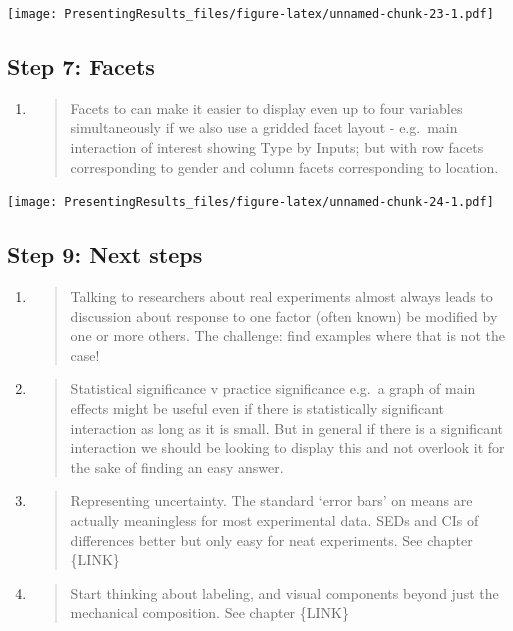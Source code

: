 \documentclass[
]{book}
\begin{document}
\texttt{[image: PresentingResults\_files/figure-latex/unnamed-chunk-23-1.pdf]}

\hypertarget{step-7-facets}{%
\subsection{Step 7: Facets}\label{step-7-facets}}

\begin{enumerate}
\def\labelenumi{\alph{enumi}.}
\item
  \begin{quote}
  Facets to can make it easier to display even up to four variables simultaneously if we also use a gridded facet layout - e.g.~main interaction of interest showing Type by Inputs; but with row facets corresponding to gender and column facets corresponding to location.
  \end{quote}
\end{enumerate}

\texttt{[image: PresentingResults\_files/figure-latex/unnamed-chunk-24-1.pdf]}

\hypertarget{step-9-next-steps}{%
\subsection{Step 9: Next steps}\label{step-9-next-steps}}

\begin{enumerate}
\def\labelenumi{\alph{enumi}.}
\item
  \begin{quote}
  Talking to researchers about real experiments almost always leads to discussion about response to one factor (often known) be modified by one or more others. The challenge: find examples where that is not the case!
  \end{quote}
\item
  \begin{quote}
  Statistical significance v practice significance e.g.~a graph of main effects might be useful even if there is statistically significant interaction as long as it is small. But in general if there is a significant interaction we should be looking to display this and not overlook it for the sake of finding an easy answer.
  \end{quote}
\item
  \begin{quote}
  Representing uncertainty. The standard `error bars' on means are actually meaningless for most experimental data. SEDs and CIs of differences better but only easy for neat experiments. See chapter \{LINK\}
  \end{quote}
\item
  \begin{quote}
  Start thinking about labeling, and visual components beyond just the mechanical composition. See chapter \{LINK\}
  \end{quote}
\end{enumerate}
\end{document}
